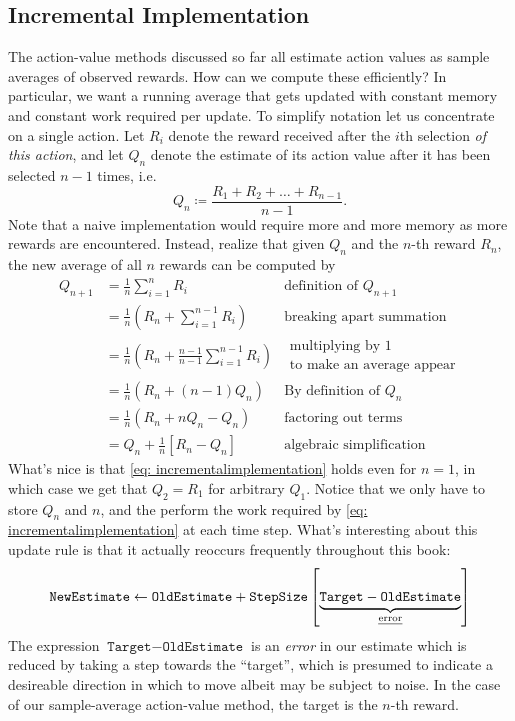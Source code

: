 \documentclass[12pt]{article}
\begin{document}
\subsection{Incremental Implementation} The action-value methods discussed so far all estimate action values as sample averages of observed rewards. How can we compute these efficiently? In particular, we want a running average that gets updated with constant memory and constant work required per update. To simplify notation let us concentrate on a single action. Let $R_i$ denote the reward received after the $i$th selection \emph{of this action}, and let $Q_n$ denote the estimate of its action value after it has been selected $n-1$ times, i.e.
\[
  Q_n \coloneqq \frac{R_1 + R_2 + \ldots + R_{n-1}}{n-1}.
\]
Note that a naive implementation would require more and more memory as more rewards are encountered. Instead, realize that given $Q_n$ and the $n$-th reward $R_n$, the new average of all $n$ rewards can be computed by
\begin{align}
  Q_{n+1} &= \frac{1}{n} \sum_{i=1}^n R_i &\textrm{definition of } Q_{n+1}\nonumber \\
          &= \frac{1}{n} \left( R_n + \sum_{i=1}^{n-1} R_i \right) &\textrm{breaking apart summation}\nonumber  \\
          &= \frac{1}{n} \left(R_n + \frac{n-1}{n-1} \sum_{i=1}^{n-1} R_i\right) &\substack{\textrm{multiplying by 1} \\ \textrm{to make an average appear}}\nonumber    \\
          &= \frac{1}{n} \left(R_n + \left(n-1\right) Q_n \right) &\textrm{By definition of } Q_n \nonumber  \\
          &= \frac{1}{n} \left(R_n + nQ_n - Q_n \right) &\textrm{factoring out terms}\nonumber  \\
  \label{eq: incrementalimplementation}
          &= Q_n + \frac{1}{n} \left[R_n - Q_n \right] &\textrm{algebraic simplification}
\end{align}
What's nice is that \ref{eq: incrementalimplementation} holds even for $n=1$, in which case we get that $Q_2 = R_1$ for arbitrary $Q_1$. Notice that we only have to store $Q_n$ and $n$, and the perform the work required by \ref{eq: incrementalimplementation} at each time step. What's interesting about this update rule is that it actually reoccurs frequently throughout this book:
\[
  \texttt{NewEstimate} \gets \texttt{OldEstimate} + \texttt{StepSize} \left[ \underbrace{\texttt{Target} - \texttt{OldEstimate}}_{\textrm{\emph{error}}} \right]
\]
The expression $\texttt{Target} - \texttt{OldEstimate}$ is an \emph{error} in our estimate which is reduced by taking a step towards the ``target'', which is presumed to indicate a desireable direction in which to move albeit may be subject to noise. In the case of our sample-average action-value method, the target is the $n$-th reward.
\end{document}
